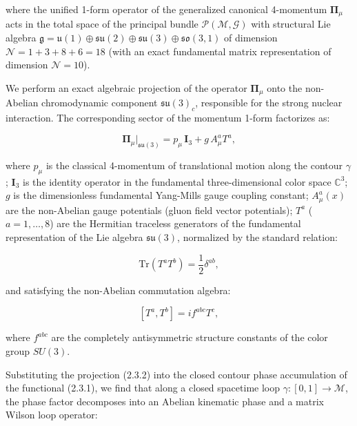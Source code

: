 where the unified 1-form operator of the generalized canonical 4-momentum $\mathbf{\Pi}_\mu$ acts in the total space of the principal bundle $\mathcal{P}(\mathcal{M}, \mathcal{G})$ with structural Lie algebra $\mathfrak{g} = \mathfrak{u}(1) \oplus \mathfrak{su}(2) \oplus \mathfrak{su}(3) \oplus \mathfrak{so}(3,1)$ of dimension $\mathcal{N} = 1 + 3 + 8 + 6 = 18$ (with an exact fundamental matrix representation of dimension $\mathcal{N} = 10$).

We perform an exact algebraic projection of the operator $\mathbf{\Pi}_\mu$ onto the non-Abelian chromodynamic component $\mathfrak{su}(3)_c$, responsible for the strong nuclear interaction. The corresponding sector of the momentum 1-form factorizes as:

\begin{equation}\label{eq:2.3.2}\tag{2.3.2}
\mathbf{\Pi}_\mu \Big|_{\mathfrak{su}(3)} = p_\mu \, \mathbf{I}_3 + g \, A_\mu^a T^a,
\end{equation}

where $p_\mu$ is the classical 4-momentum of translational motion along the contour $\gamma$;  
$\mathbf{I}_3$ is the identity operator in the fundamental three-dimensional color space $\mathbb{C}^3$;  
$g$ is the dimensionless fundamental Yang-Mills gauge coupling constant;  
$A_\mu^a(x)$ are the non-Abelian gauge potentials (gluon field vector potentials);  
$T^a$ ($a = 1, \dots, 8$) are the Hermitian traceless generators of the fundamental representation of the Lie algebra $\mathfrak{su}(3)$, normalized by the standard relation:

\begin{equation}\label{eq:2.3.3}\tag{2.3.3}
\text{Tr}\left( T^a T^b \right) = \frac{1}{2} \delta^{ab},
\end{equation}

and satisfying the non-Abelian commutation algebra:

\begin{equation}\label{eq:2.3.4}\tag{2.3.4}
\left[ T^a, T^b \right] = i f^{abc} T^c,
\end{equation}

where $f^{abc}$ are the completely antisymmetric structure constants of the color group $SU(3)$.

Substituting the projection (2.3.2) into the closed contour phase accumulation of the functional (2.3.1), we find that along a closed spacetime loop $\gamma: [0, 1] \to \mathcal{M}$, the phase factor decomposes into an Abelian kinematic phase and a matrix Wilson loop operator:

